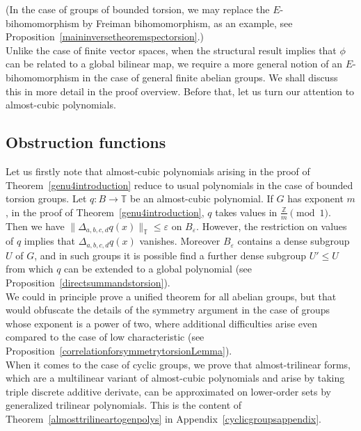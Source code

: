 \documentclass[a4paper,11pt]{article}
\numberwithin{theorem}{section}
\theoremstyle{definition}
\begin{document}
(In the case of groups of bounded torsion, we may replace the $E$-bihomomorphism by Freiman bihomomorphism, as an example, see Proposition~\ref{maininversetheoremspectorsion}.)\\

Unlike the case of finite vector spaces, when the structural result implies that $\phi$ can be related to a global bilinear map, we require a more general notion of an $E$-bihomomorphism in the case of general finite abelian groups. We shall discuss this in more detail in the proof overview. Before that, let us turn our attention to almost-cubic polynomials.\\

\subsection{Obstruction functions}

Let us firstly note that almost-cubic polynomials arising in the proof of Theorem~\ref{genu4introduction} reduce to usual polynomials in the case of bounded torsion groups. Let $q: B \to \mathbb{T}$ be an almost-cubic polynomial. If $G$ has exponent $m$, in the proof of Theorem~\ref{genu4introduction}, $q$ takes values in $\frac{\mathbb{Z}}{m} \pmod{1}$. Then we have $\|\Delta_{a,b,c,d}q(x)\|_{\mathbb{T}} \leq \varepsilon$ on $B_{\varepsilon}$. However, the restriction on values of $q$ implies that $\Delta_{a,b,c,d}q(x)$ vanishes. Moreover $B_\varepsilon$ contains a dense subgroup $U$ of $G$, and in such groups it is possible find a further dense subgroup $U' \leq U$ from which $q$ can be extended to a global polynomial (see Proposition~\ref{directsummandstorsion}).\\

We could in principle prove a unified theorem for all abelian groups, but that would obfuscate the details of the symmetry argument in the case of groups whose exponent is a power of two, where additional difficulties arise even compared to the case of low characteristic (see Proposition~\ref{correlationforsymmetrytorsionLemma}).\\

When it comes to the case of cyclic groups, we prove that almost-trilinear forms, which are a multilinear variant of almost-cubic polynomials and arise by taking triple discrete additive derivate, can be approximated on lower-order sets by generalized trilinear polynomials. This is the content of Theorem~\ref{almosttrilineartogenpolys} in Appendix~\ref{cyclicgroupsappendix}.\\
\end{document}
